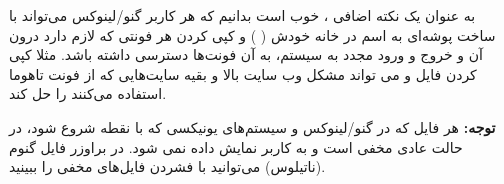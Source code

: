 
به عنوان یک نکته اضافی ، خوب است بدانیم که هر کاربر گنو/لینوکس می‌تواند با ساخت پوشه‌ای به اسم 
 در خانه خودش ( 
 ) و کپی کردن هر فونتی که لازم دارد درون آن و خروج و ورود مجدد به سیستم، به آن فونت‌ها دسترسی داشته باشد. مثلا کپی کردن فایل 
 و 
 می تواند مشکل وب سایت بالا و بقیه سایت‌هایی که از فونت تاهوما استفاده می‌کنند را حل کند.
 
\textbf{توجه: }
هر فایل که در گنو/لینوکس و سیستم‌های یونیکسی که با نقطه شروع شود،‌ در حالت عادی مخفی است و به کاربر نمایش داده نمی شود. در براوزر فایل گنوم (ناتیلوس) می‌توانید با فشردن 
 فایل‌های مخفی را ببینید.
